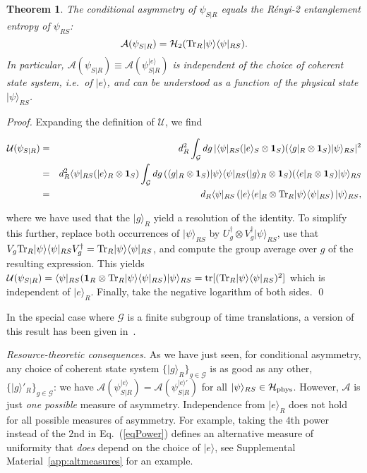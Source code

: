 \documentclass[aps,10pt,twocolumn,showpacs,pra,citeautoscript,amsmath,amssymb,floatfix,superscriptaddress]{revtex4-1}
\newtheorem{theorem}{Theorem}
\begin{document}
\begin{theorem}
\label{TheA}
The conditional asymmetry of $\psi_{S|R}$ equals the R\'enyi-2 entanglement entropy of $\psi_{RS}$:
\[
   \mathcal{A}(\psi_{S|R})=\mathcal{H}_2({\rm Tr}_R |\psi\rangle\langle\psi|_{RS}).
\]
In particular, $\mathcal{A}(\psi_{S|R})\equiv \mathcal{A}(\psi_{S|R}^{|e\rangle})$ is \emph{independent} of the choice of coherent state system, i.e.\ of $|e\rangle$, and can be understood as a function of the physical state $|\psi\rangle_{RS}$.
\end{theorem}
\emph{Proof.} Expanding the definition of $\mathcal{U}$, we find
\begin{widetext}
\begin{eqnarray*}
\mathcal{U}(\psi_{S|R})&=&d_R^2\int_{\mathcal{G}}dg\,|\langle\psi|_{RS}(|e\rangle_S\otimes\mathbf{1}_S)(\langle g|_R\otimes\mathbf{1}_S)|\psi\rangle_{RS}|^2\\
&=& d_R^2 \langle\psi|_{RS}(|e\rangle_R\otimes\mathbf{1}_S)\int_{\mathcal{G}}dg\, (\langle g|_R\otimes\mathbf{1}_S)|\psi\rangle\langle\psi|_{RS}(|g\rangle_R\otimes\mathbf{1}_S)(\langle e|_R\otimes\mathbf{1}_S)|\psi\rangle_{RS}\\
&=& d_R \langle \psi|_{RS}\left(|e\rangle\langle e|_R\otimes {\rm Tr}_R |\psi\rangle\langle\psi|_{RS}\right)|\psi\rangle_{RS},
\end{eqnarray*}
\end{widetext}
where we have used that the $|g\rangle_R$ yield a resolution of the identity. To simplify this further, replace both occurrences of $|\psi\rangle_{RS}$ by $U_g^\dagger\otimes V_g^\dagger|\psi\rangle_{RS}$, use that $V_g {\rm Tr}_R |\psi\rangle\langle\psi|_{RS} V_g^\dagger={\rm Tr}_R |\psi\rangle\langle\psi|_{RS}$, and compute the group average over $g$ of the resulting expression. This yields $\mathcal{U}(\psi_{S|R})=\langle\psi|_{RS}(\mathbf{1}_R\otimes{\rm Tr}_R|\psi\rangle\langle\psi|_{RS})|\psi\rangle_{RS}={\rm tr}[({\rm Tr}_R|\psi\rangle\langle\psi|_{RS})^2]$ which is independent of $|e\rangle_R$. Finally, take the negative logarithm of both sides.
\qed

In the special case where $\mathcal{G}$ is a finite subgroup of time translations, a version of this result has been given in~\cite{Boette}.

\emph{Resource-theoretic consequences.} As we have just seen, for conditional asymmetry, any choice of coherent state system $\{|g\rangle_R\}_{g\in\mathcal{G}}$ is as good as any other, $\{|g\rangle'_R\}_{g\in\mathcal{G}}$: we have $\mathcal{A}(\psi_{S|R}^{|e\rangle})=\mathcal{A}(\psi_{S|R}^{|e\rangle'})$ for all $|\psi\rangle_{RS}\in\mathcal{H}_{\rm phys}$. However, $\mathcal{A}$ is just \emph{one possible} measure of asymmetry. Independence from $|e\rangle_R$ does not hold for all possible measures of asymmetry. For example, taking the $4$th power instead of the $2$nd in Eq.~(\ref{eqPower}) defines an alternative measure of uniformity that \emph{does} depend on the choice of $|e\rangle$, see Supplemental Material~\ref{app:altmeasures} for an example.
\end{document}
